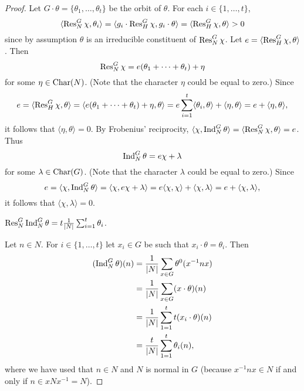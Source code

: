 \begin{proof}
    Let $G\cdot\theta=\{\theta_1,\dots,\theta_t\}$ be the 
    orbit of $\theta$. For each $i\in\{1,\dots,t\}$, 
    \[
    \langle\operatorname{Res}_N^G\chi,\theta_i\rangle 
    =\langle g_i\cdot \operatorname{Res}_H^G\chi,g_i\cdot\theta\rangle
    =\langle\operatorname{Res}_H^G\chi,\theta\rangle>0
    \]
    since by assumption $\theta$ is an irreducible constituent of $\operatorname{Res}_N^G\chi$. 
    Let $e=\langle\operatorname{Res}_H^G\chi,\theta\rangle$. Then 
    \[
    \operatorname{Res}_N^G\chi=e(\theta_1+\cdots+\theta_t)+\eta
    \]
    for some $\eta\in\operatorname{Char}(N)$. (Note that the character $\eta$ could be equal to zero.) Since 
    \[
    e=\langle\operatorname{Res}_H^G\chi,\theta\rangle
    =\langle e(\theta_1+\cdots+\theta_t)+\eta,\theta\rangle
    =e\sum_{i=1}^t\langle\theta_i,\theta\rangle+\langle\eta,\theta\rangle
    =e+\langle\eta,\theta\rangle,
    \]
    it follows that $\langle\eta,\theta\rangle=0$. By Frobenius' reciprocity, 
    $\langle\chi,\operatorname{Ind}_N^G\theta\rangle
    =\langle\operatorname{Res}_N^G\chi,\theta\rangle=e$.
    Thus 
    \[
    \operatorname{Ind}_N^G\theta=e\chi+\lambda 
    \]
    for some $\lambda\in\operatorname{Char}(G)$. (Note that the character
    $\lambda$ could be equal to zero.) Since 
    \[
    e=\langle\chi,\operatorname{Ind}_N^G\theta\rangle 
    =\langle\chi, e\chi+\lambda\rangle
    =e\langle\chi,\chi\rangle+\langle\chi,\lambda\rangle 
    =e+\langle\chi,\lambda\rangle,
    \]
    it follows that $\langle\chi,\lambda\rangle=0$.

    \begin{claim}
        $\operatorname{Res}_N^G\operatorname{Ind}_N^G\theta=t\frac{1}{|N|}\sum_{i=1}^t\theta_i$.
    \end{claim}

    Let $n\in N$. For $i\in\{1,\dots,t\}$ let 
    $x_i\in G$ be such that $x_i\cdot\theta=\theta_i$. Then 
    \begin{align*}
        (\operatorname{Ind}_N^G\theta)(n) &= \frac{1}{|N|}\sum_{x\in G}\theta^0(x^{-1}nx)\\
        &=\frac{1}{|N|}\sum_{x\in G}(x\cdot\theta)(n)\\
        &=\frac{1}{|N|}\sum_{1=1}^t t(x_i\cdot\theta)(n)\\
        &=\frac{t}{|N|}\sum_{1=1}^t \theta_i(n), 
    \end{align*}
    where we have used that $n\in N$ and $N$ is normal in $G$ (because $x^{-1}nx\in N$ if and only if
    $n\in xNx^{-1}=N$). 


\end{proof}
